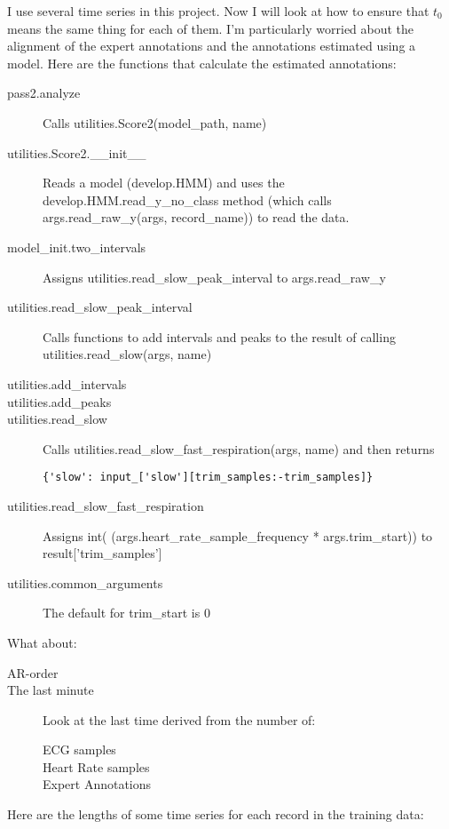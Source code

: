 \documentclass[12pt]{article}
\begin{document}
I use several time series in this project.  Now I will look at how to
ensure that $t_0$ means the same thing for each of them.  I'm
particularly worried about the alignment of the expert annotations
and the annotations estimated using a model.  Here are the functions
that calculate the estimated annotations:
\begin{description}
\item[pass2.analyze] Calls utilities.Score2(model\_path, name)
\item[utilities.Score2.\_\_init\_\_] Reads a model (develop.HMM) and
  uses the develop.HMM.read\_y\_no\_class method (which calls
  args.read\_raw\_y(args, record\_name)) to read the data.
\item[model\_init.two\_intervals] Assigns
  utilities.read\_slow\_peak\_interval to args.read\_raw\_y
\item[utilities.read\_slow\_peak\_interval] Calls functions to add
  intervals and peaks to the result of calling
  utilities.read\_slow(args, name)
\item[utilities.add\_intervals] 
\item[utilities.add\_peaks]
\item[utilities.read\_slow] Calls
  utilities.read\_slow\_fast\_respiration(args, name) and then returns
\begin{verbatim}
{'slow': input_['slow'][trim_samples:-trim_samples]}
\end{verbatim}
\item[utilities.read\_slow\_fast\_respiration] Assigns int(
  (args.heart\_rate\_sample\_frequency * args.trim\_start)) to
  result['trim\_samples']
\item[utilities.common\_arguments] The default for trim\_start is 0
\end{description}

What about:
\begin{description}
\item[AR-order] 
\item[The last minute] Look at the last time derived from the number of:
  \begin{description}
  \item[ECG samples] 
  \item[Heart Rate samples] 
  \item[Expert Annotations] 
  \end{description}
\end{description}

Here are the lengths of some time series for each record in the
training data:
\end{document}
